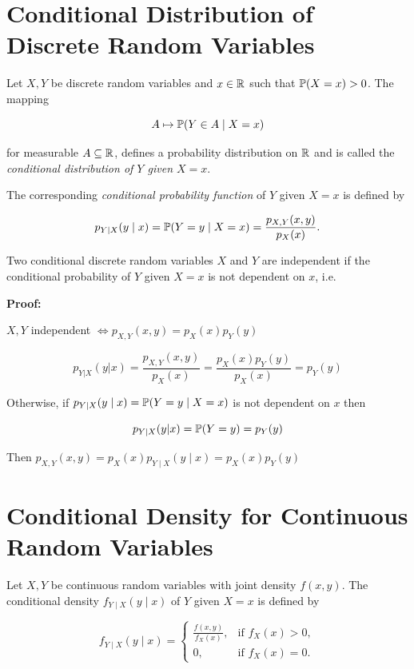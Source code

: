 \section{Conditional Distribution of Discrete Random Variables}

Let \( X, Y \) be discrete random variables and \( x \in \mathbb{R} \) such that \( \mathbb{P}(X = x) > 0 \).
The mapping

\[
    A \mapsto \mathbb{P}(Y \in A \mid X = x)
\]

for measurable \( A \subseteq \mathbb{R} \), defines a probability distribution on \( \mathbb{R} \)
and is called the \emph{conditional distribution of \( Y \) given \( X = x \)}.

The corresponding \emph{conditional probability function} of \( Y \) given \( X = x \) is defined by

\[
    p_{Y|X}(y \mid x) = \mathbb{P}(Y = y \mid X = x)
    = \frac{p_{X,Y}(x, y)}{p_X(x)}.
\]

Two conditional discrete random variables \(X\) and \(Y\) are independent if the conditional probability of \(Y\) given \(X = x\) is
not dependent on \(x\), i.e.

\textbf{Proof:}

\(X,Y\) independent \(\iff p_{X, Y} (x,y) = p_X(x)p_Y(y)\)

\[
    p_{Y|X}(y|x) = \frac{p_{X,Y}(x,y)}{p_X(x)} = \frac{p_X(x)p_Y(y)}{p_X(x)} = p_Y(y)
\]

Otherwise, if \(p_{Y \mid X}(y \mid x) = \mathbb{P}(Y = y \mid X = x)\) is not dependent on \(x\) then

\[
    p_{Y|X}(y|x) = \mathbb{P}(Y = y) = p_Y(y)
\]

Then \(p_{X, Y}(x,y) =  p_X(x) p_{Y \mid X}(y \mid x)= p_X(x)p_Y(y)\)

\section{Conditional Density for Continuous Random Variables}

Let \(X, Y\) be continuous random variables with joint density \(f(x,y)\).
The conditional density \(f_{Y\mid X}(y\mid x)\) of \(Y\) given \(X = x\) is defined by

\[
    f_{Y\mid X}(y\mid x)
    =
    \begin{cases}
        \frac{f(x,y)}{f_X(x)}, & \text{if } f_X(x) > 0, \\[8pt]
        0, & \text{if } f_X(x) = 0.
    \end{cases}
\]

